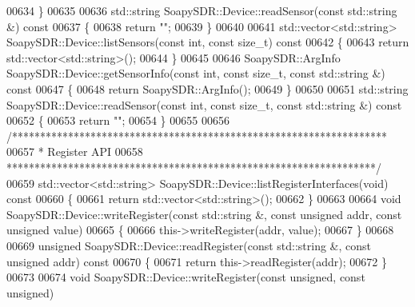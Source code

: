 \begin{DoxyCode}
00634 \}
00635 
00636 std::string SoapySDR::Device::readSensor(\textcolor{keyword}{const} std::string &)\textcolor{keyword}{ const}
00637 \textcolor{keyword}{}\{
00638     \textcolor{keywordflow}{return} \textcolor{stringliteral}{""};
00639 \}
00640 
00641 std::vector<std::string> SoapySDR::Device::listSensors(\textcolor{keyword}{const} \textcolor{keywordtype}{int}, \textcolor{keyword}{const} \textcolor{keywordtype}{size\_t})\textcolor{keyword}{ const}
00642 \textcolor{keyword}{}\{
00643     \textcolor{keywordflow}{return} std::vector<std::string>();
00644 \}
00645 
00646 SoapySDR::ArgInfo SoapySDR::Device::getSensorInfo(\textcolor{keyword}{const} \textcolor{keywordtype}{int}, \textcolor{keyword}{const} \textcolor{keywordtype}{size\_t}, \textcolor{keyword}{const} 
      std::string &)\textcolor{keyword}{ const}
00647 \textcolor{keyword}{}\{
00648     \textcolor{keywordflow}{return} SoapySDR::ArgInfo();
00649 \}
00650 
00651 std::string SoapySDR::Device::readSensor(\textcolor{keyword}{const} \textcolor{keywordtype}{int}, \textcolor{keyword}{const} \textcolor{keywordtype}{size\_t}, \textcolor{keyword}{const} 
      std::string &)\textcolor{keyword}{ const}
00652 \textcolor{keyword}{}\{
00653     \textcolor{keywordflow}{return} \textcolor{stringliteral}{""};
00654 \}
00655 
00656 \textcolor{comment}{/*******************************************************************}
00657 \textcolor{comment}{ * Register API}
00658 \textcolor{comment}{ ******************************************************************/}
00659 std::vector<std::string> SoapySDR::Device::listRegisterInterfaces(\textcolor{keywordtype}{void})\textcolor{keyword}{ const}
00660 \textcolor{keyword}{}\{
00661     \textcolor{keywordflow}{return} std::vector<std::string>();
00662 \}
00663 
00664 \textcolor{keywordtype}{void} SoapySDR::Device::writeRegister(\textcolor{keyword}{const} std::string &, \textcolor{keyword}{const} \textcolor{keywordtype}{unsigned} addr, \textcolor{keyword}{const} \textcolor{keywordtype}{unsigned} value)
00665 \{
00666     this->writeRegister(addr, value);
00667 \}
00668 
00669 \textcolor{keywordtype}{unsigned} SoapySDR::Device::readRegister(\textcolor{keyword}{const} std::string &, \textcolor{keyword}{const} \textcolor{keywordtype}{unsigned} addr)\textcolor{keyword}{ const}
00670 \textcolor{keyword}{}\{
00671     \textcolor{keywordflow}{return} this->readRegister(addr);
00672 \}
00673 
00674 \textcolor{keywordtype}{void} SoapySDR::Device::writeRegister(\textcolor{keyword}{const} \textcolor{keywordtype}{unsigned}, \textcolor{keyword}{const} \textcolor{keywordtype}{unsigned})

\end{DoxyCode}
